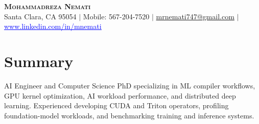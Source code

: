\documentclass[letterpaper,13pt]{article}
\begin{document}
\begin{center}
    \textbf{\LARGE \scshape Mohammadreza Nemati} \\ \vspace{1pt}
    \small Santa Clara, CA 95054 $|$ Mobile: 567-204-7520 $|$
    \href{mailto:mrnemati747@gmail.com}{mrnemati747@gmail.com} $|$
    \href{https://www.linkedin.com/in/mnemati/}{\textcolor{blue}{\underline{www.linkedin.com/in/mnemati}}}
\end{center}

\section{Summary}
\small{AI Engineer and Computer Science PhD specializing in ML compiler workflows, GPU kernel optimization, AI workload performance, and distributed deep learning. Experienced developing CUDA and Triton operators, profiling foundation-model workloads, and benchmarking training and inference systems.}
\vspace{0.05cm}
\end{document}
